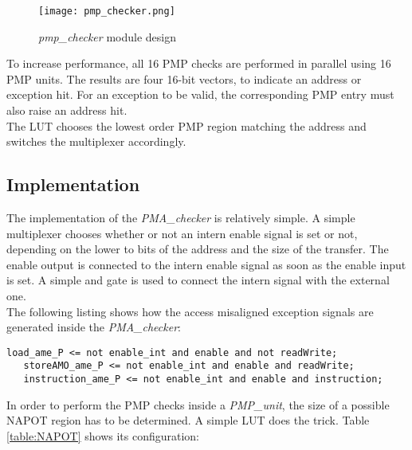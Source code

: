 \begin{figure}[H]
	\centering
	\texttt{[image: pmp\_checker.png]}
	\caption{\textit{pmp\_checker} module design}
	\label{fig:pmpChecker}
\end{figure}

To increase performance, all 16 \ac{PMP} checks are performed in parallel using 16 \ac{PMP} units. The results are four 16-bit vectors, to indicate an address or exception hit. For an exception to be valid, the corresponding \ac{PMP} entry must also raise an address hit. \\
The \ac{LUT} chooses the lowest order \ac{PMP} region matching the address and switches the multiplexer accordingly. 

\subsection{Implementation}
The implementation of the \textit{PMA\_checker} is relatively simple. A simple multiplexer chooses whether or not an intern enable signal is set or not, depending on the lower to bits of the address and the size of the transfer. The enable output is connected to the intern enable signal as soon as the enable input is set. A simple and gate is used to connect the intern signal with the external one. \\
The following listing shows how the access misaligned exception signals are generated inside the \textit{PMA\_checker}:\clearpage
\begin{lstlisting}[style=vhdl, caption=access misaligend exception generation]
   load_ame_P <= not enable_int and enable and not readWrite;
   storeAMO_ame_P <= not enable_int and enable and readWrite;
   instruction_ame_P <= not enable_int and enable and instruction;
\end{lstlisting}

In order to perform the \ac{PMP} checks inside a \textit{PMP\_unit}, the size of a possible \ac{NAPOT} region has to be determined. A simple \ac{LUT} does the trick. Table \ref{table:NAPOT} shows its configuration:

